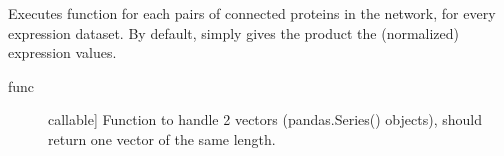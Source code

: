 \documentclass[letterpaper,10pt,english]{sphinxmanual}
\begin{document}
\begin{fulllineitems}
\begin{fulllineitems}
\end{fulllineitems}


\begin{fulllineitems}
\label{\detokenize{main:pypath.main.PyPath.edge_loc}}
\end{fulllineitems}


\begin{fulllineitems}
\label{\detokenize{main:pypath.main.PyPath.edge_names}}
\end{fulllineitems}


\begin{fulllineitems}
\label{\detokenize{main:pypath.main.PyPath.edges_3d}}
\end{fulllineitems}


\begin{fulllineitems}
\label{\detokenize{main:pypath.main.PyPath.edges_expression}}
Executes function  for each pairs of connected proteins in the
network, for every expression dataset. By default,  simply
gives the product the (normalized) expression values.
\begin{description}
\item[{func}] \leavevmode{[}callable{]}
Function to handle 2 vectors (pandas.Series() objects), should
return one vector of the same length.

\end{description}

\end{fulllineitems}



\end{fulllineitems}
\end{document}
